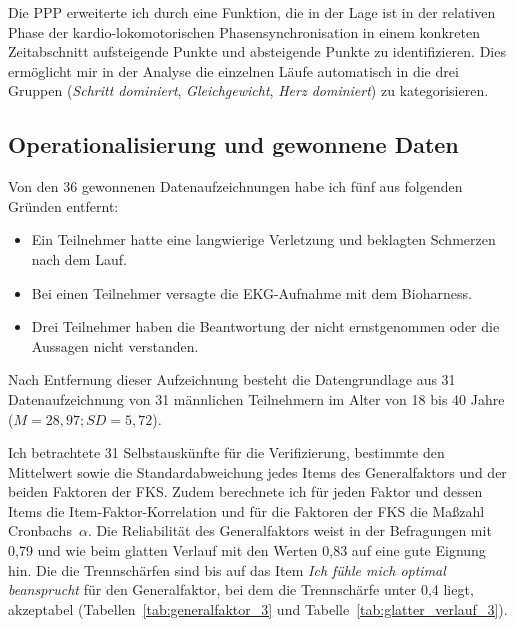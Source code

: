 Die \ac{PPP} erweiterte ich durch eine Funktion, die in der Lage ist in der relativen Phase der kardio-lokomotorischen Phasensynchronisation in einem konkreten Zeitabschnitt aufsteigende Punkte und absteigende Punkte zu identifizieren. Dies ermöglicht mir in der Analyse die einzelnen Läufe automatisch in die drei Gruppen (\emph{Schritt dominiert}, \emph{Gleichgewicht}, \emph{Herz dominiert}) zu kategorisieren. 

\subsection{Operationalisierung und gewonnene Daten} 

\label{sub:operationalisierung_und_gewonnene_daten_5_3}

Von den 36 gewonnenen Datenaufzeichnungen habe ich fünf aus folgenden Gründen entfernt:
\begin{itemize}
	
	\item Ein Teilnehmer hatte eine langwierige Verletzung und beklagten Schmerzen nach dem Lauf.
	
	\item Bei einen Teilnehmer versagte die EKG-Aufnahme mit dem Bioharness.
	
	\item Drei Teilnehmer haben die Beantwortung der nicht ernstgenommen oder die Aussagen nicht verstanden.
\end{itemize}

Nach Entfernung dieser Aufzeichnung besteht die Datengrundlage aus 31 Datenaufzeichnung von 31 männlichen Teilnehmern im Alter von 18 bis 40 Jahre ($M = 28{,}97; SD = 5{,}72$).

Ich betrachtete 31 Selbstauskünfte für die Verifizierung, bestimmte den Mittelwert sowie die Standardabweichung jedes Items des Generalfaktors und der beiden Faktoren der \ac{FKS}. Zudem berechnete ich für jeden Faktor und dessen Items die Item-Faktor-Korrelation und für die Faktoren der \ac{FKS} die Maßzahl Cronbachs~$\alpha$. Die Reliabilität des Generalfaktors weist in der Befragungen mit 0,79 und wie beim glatten Verlauf mit den Werten 0,83 auf eine gute Eignung hin. Die die Trennschärfen sind bis auf das Item \emph{Ich fühle mich optimal beansprucht} für den Generalfaktor, bei dem die Trennschärfe unter 0,4 liegt, akzeptabel (Tabellen~\ref{tab:generalfaktor_3} und Tabelle~\ref{tab:glatter_verlauf_3}).

